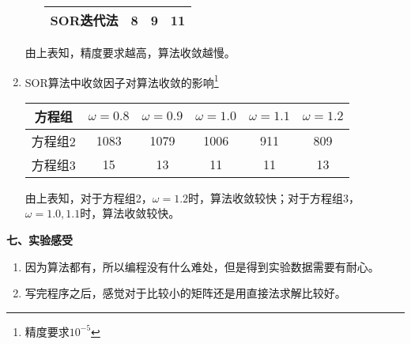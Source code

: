 \documentclass[a4paper,11pt]{article}
\begin{document}
\begin{enumerate}
\begin{enumerate}[(1)]
\begin{center}
\begin{tabular}{|c|c|c|c|}
			\hline
			SOR迭代法 & 8 & 9 & 11 \\
			\hline
			\end{tabular}
		\end{center}
	\end{enumerate}
	由上表知，精度要求越高，算法收敛越慢。
	\item SOR算法中收敛因子对算法收敛的影响\footnote{精度要求$10^{-5}$}
	\begin{center}
		\begin{tabular}{|c|c|c|c|c|c|}
		\hline
		方程组 & $\omega=0.8$ & $\omega=0.9$ & $\omega=1.0$ & $\omega=1.1$ & $\omega=1.2$ \\
		\hline
		方程组2 & 1083 & 1079 & 1006 & 911 & 809\\
		\hline
		方程组3 & 15 & 13 & 11 & 11 & 13\\
		\hline
		\end{tabular}
	\end{center}
	由上表知，对于方程组2，$\omega=1.2$时，算法收敛较快；对于方程组3，$\omega=1.0,1.1$时，算法收敛较快。
\end{enumerate}
\begin{Large}
	\textbf{七、实验感受}
\end{Large}
\begin{enumerate}
	\item 因为算法都有，所以编程没有什么难处，但是得到实验数据需要有耐心。
	\item 写完程序之后，感觉对于比较小的矩阵还是用直接法求解比较好。
\end{enumerate}
\end{document}
